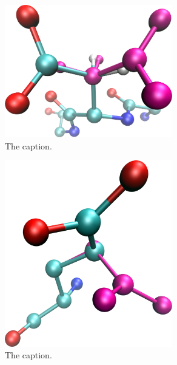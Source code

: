 \begin{figure}[h]
  \centering
  \includegraphics[width=0.65\textwidth,height=0.3\textheight,keepaspectratio]{figures/mutation_side_chain_images/1dvf_chain_b_100.png}
  \caption{The caption.}
  \label{figure:computational_mutation_scanning/figname}
\end{figure}


\begin{figure}[h]
  \centering
  \includegraphics[width=0.65\textwidth,height=0.3\textheight,keepaspectratio]{figures/mutation_side_chain_images/1brs_chain_d_80.png}
  \caption{The caption.}
  \label{figure:computational_mutation_scanning/figname}
\end{figure}

